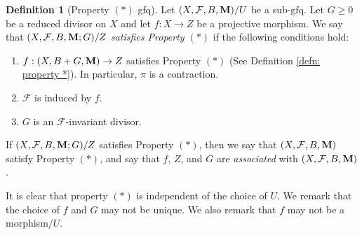 \documentclass[11pt]{amsart}
\numberwithin{equation}{section}
\newcommand{\Mm}{{\bf{M}}}
\newcommand{\Ff}{\mathcal{F}}
\theoremstyle{definition}
\newtheorem{defn}[thm]{Definition}
\theoremstyle{definition}
\theoremstyle{definition}
\begin{document}
\begin{defn}[Property $(*)$ gfq]\label{defn: foliation property *}
Let $(X,\Ff,B,\Mm)/U$ be a sub-gfq. Let $G\geq 0$ be a reduced divisor on $X$ and let $f: X\rightarrow Z$ be a projective morphism. We say that $(X,\Ff,B,\Mm;G)/Z$ \emph{satisfies Property $(*)$} if the following conditions hold:
\begin{enumerate}
  \item $f: (X,B+G,\Mm)\rightarrow Z$ satisfies Property $(*)$ (See Definition \ref{defn: property *}). In particular, $\pi$ is a contraction.
  \item $\Ff$ is induced by $f$.
  \item $G$ is an $\Ff$-invariant divisor.
\end{enumerate}

If $(X,\Ff,B,\Mm;G)/Z$ satisfies Property $(*)$, then we say that $(X,\Ff,B,\Mm)$ satisfy Property $(*)$, and say that $f$, $Z$, and $G$ are \emph{associated} with $(X,\Ff,B,\Mm)$.

It is clear that property $(*)$ is independent of the choice of $U$. We remark that the choice of $f$ and $G$ may not be unique. We also remark that $f$ may not be a morphism$/U$.
\end{defn}
\end{document}
